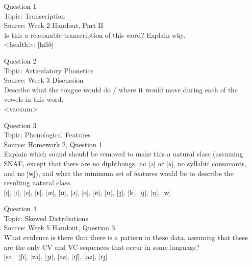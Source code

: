 \documentclass[12pt]{article}
\begin{document}
{\large Question 1}\\

Topic: Transcription\\
Source: Week 2 Handout, Part II\\

Is this a reasonable transcription of this word? Explain why.\\

<health>: {[hɛlð]}


\newpage

{\large Question 2}\\

Topic: Articulatory Phonetics\\
Source: Week 3 Discussion\\

Describe what the tongue would do / where it would move during each of the vowels in this word.\\

<vacuum>


\newpage

{\large Question 3}\\

Topic: Phonological Features\\
Source: Homework 2, Question 1\\

Explain which sound should be removed to make this a natural class (assuming SNAE, except that there are no diphthongs, no [ə] or [ʌ], no syllabic consonants, and no [w̥]), and what the minimum set of features would be to describe the resulting natural class.\\

{[i]}, {[ɪ]}, {[e]}, {[ɛ]}, {[æ]}, {[ɑ]}, {[ɔ]}, {[o]}, {[ʊ]}, {[u]}, {[ʒ]}, {[k]}, {[ɡ]}, {[ŋ]}, {[w]}


\newpage

{\large Question 4}\\

Topic: Skewed Distributions\\
Source: Week 5 Handout, Question 3\\

What evidence is there that there is a pattern in these data, assuming that these are the only CV and VC sequences that occur in some language?\\

{[sa]}, {[ʃi]}, {[za]}, {[ʒi]}, {[as]}, {[iʃ]}, {[az]}, {[iʒ]}


\newpage
\end{document}
